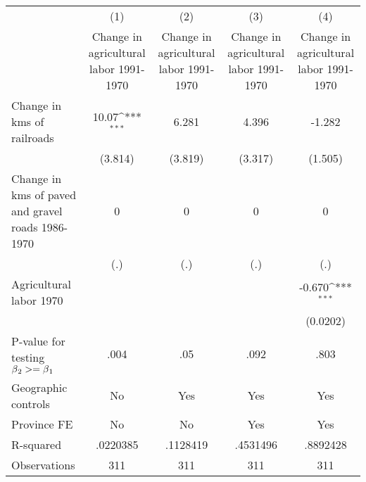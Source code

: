 {
\def\sym#1{\ifmmode^{#1}\else\(^{#1}\)\fi}
\begin{tabular}{l*{4}{c}}
\hline\hline
                &\multicolumn{1}{c}{(1)}&\multicolumn{1}{c}{(2)}&\multicolumn{1}{c}{(3)}&\multicolumn{1}{c}{(4)}\\
                &\multicolumn{1}{c}{Change in agricultural labor 1991-1970}&\multicolumn{1}{c}{Change in agricultural labor 1991-1970}&\multicolumn{1}{c}{Change in agricultural labor 1991-1970}&\multicolumn{1}{c}{Change in agricultural labor 1991-1970}\\
\hline
Change in kms of railroads&    10.07\sym{***}&    6.281         &    4.396         &   -1.282         \\
                &  (3.814)         &  (3.819)         &  (3.317)         &  (1.505)         \\
[1em]
Change in kms of paved and gravel roads 1986-1970&        0         &        0         &        0         &        0         \\
                &      (.)         &      (.)         &      (.)         &      (.)         \\
[1em]
Agricultural labor 1970&                  &                  &                  &   -0.670\sym{***}\\
                &                  &                  &                  & (0.0202)         \\
\hline
P-value for testing $\beta\\_2 >= \beta\\_1$&     .004         &      .05         &     .092         &     .803         \\
Geographic controls&       No         &      Yes         &      Yes         &      Yes         \\
Province FE     &       No         &       No         &      Yes         &      Yes         \\
R-squared       & .0220385         & .1128419         & .4531496         & .8892428         \\
Observations    &      311         &      311         &      311         &      311         \\
\hline\hline
\end{tabular}
}
